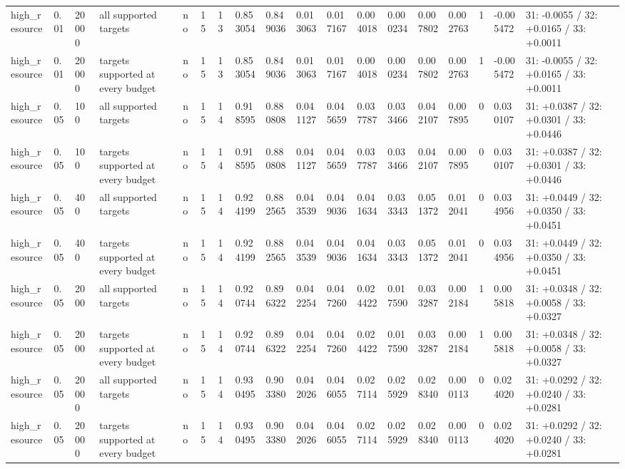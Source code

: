 \begin{tabular}{llllllllllllllllll}
high\_resource & 0.01 & 20000 & all supported targets & no & 15 & 13 & 0.853054 & 0.849036 & 0.013063 & 0.017167 & 0.004018 & 0.000234 & 0.007802 & 0.002763 & 1 & -0.005472 & 31: -0.0055 / 32: +0.0165 / 33: +0.0011 \\
high\_resource & 0.01 & 20000 & targets supported at every budget & no & 15 & 13 & 0.853054 & 0.849036 & 0.013063 & 0.017167 & 0.004018 & 0.000234 & 0.007802 & 0.002763 & 1 & -0.005472 & 31: -0.0055 / 32: +0.0165 / 33: +0.0011 \\
high\_resource & 0.05 & 100 & all supported targets & no & 15 & 14 & 0.918595 & 0.880808 & 0.041127 & 0.045659 & 0.037787 & 0.033466 & 0.042107 & 0.007895 & 0 & 0.030107 & 31: +0.0387 / 32: +0.0301 / 33: +0.0446 \\
high\_resource & 0.05 & 100 & targets supported at every budget & no & 15 & 14 & 0.918595 & 0.880808 & 0.041127 & 0.045659 & 0.037787 & 0.033466 & 0.042107 & 0.007895 & 0 & 0.030107 & 31: +0.0387 / 32: +0.0301 / 33: +0.0446 \\
high\_resource & 0.05 & 400 & all supported targets & no & 15 & 14 & 0.924199 & 0.882565 & 0.043539 & 0.049036 & 0.041634 & 0.033343 & 0.051372 & 0.012041 & 0 & 0.034956 & 31: +0.0449 / 32: +0.0350 / 33: +0.0451 \\
high\_resource & 0.05 & 400 & targets supported at every budget & no & 15 & 14 & 0.924199 & 0.882565 & 0.043539 & 0.049036 & 0.041634 & 0.033343 & 0.051372 & 0.012041 & 0 & 0.034956 & 31: +0.0449 / 32: +0.0350 / 33: +0.0451 \\
high\_resource & 0.05 & 2000 & all supported targets & no & 15 & 14 & 0.920744 & 0.896322 & 0.042254 & 0.047260 & 0.024422 & 0.017590 & 0.033287 & 0.002184 & 1 & 0.005818 & 31: +0.0348 / 32: +0.0058 / 33: +0.0327 \\
high\_resource & 0.05 & 2000 & targets supported at every budget & no & 15 & 14 & 0.920744 & 0.896322 & 0.042254 & 0.047260 & 0.024422 & 0.017590 & 0.033287 & 0.002184 & 1 & 0.005818 & 31: +0.0348 / 32: +0.0058 / 33: +0.0327 \\
high\_resource & 0.05 & 20000 & all supported targets & no & 15 & 14 & 0.930495 & 0.903380 & 0.042026 & 0.046055 & 0.027114 & 0.025929 & 0.028340 & 0.000113 & 0 & 0.024020 & 31: +0.0292 / 32: +0.0240 / 33: +0.0281 \\
high\_resource & 0.05 & 20000 & targets supported at every budget & no & 15 & 14 & 0.930495 & 0.903380 & 0.042026 & 0.046055 & 0.027114 & 0.025929 & 0.028340 & 0.000113 & 0 & 0.024020 & 31: +0.0292 / 32: +0.0240 / 33: +0.0281 \\
\bottomrule
\end{tabular}
